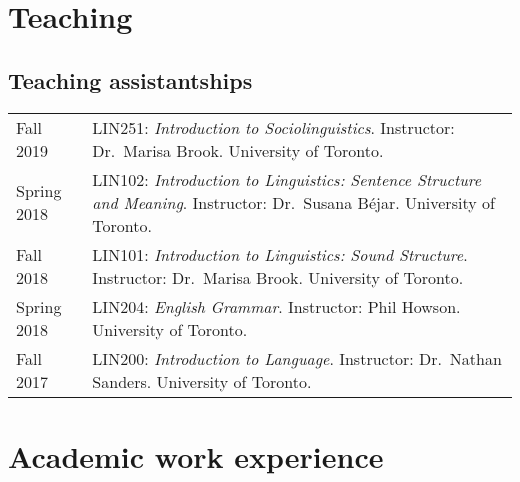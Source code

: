 \documentclass[letterpaper]{article}
\begin{document}
\section*{Teaching}

\subsection*{Teaching assistantships}

\begin{longtable}{p{}p{}}
    Fall 2019 & LIN251: \emph{Introduction to Sociolinguistics}. Instructor:
    Dr.~Marisa Brook. University of Toronto. \\
    Spring 2018 & LIN102: \emph{Introduction to Linguistics: Sentence Structure
    and Meaning}. Instructor: Dr.~Susana B\'ejar. University of Toronto. \\
    Fall 2018 & LIN101: \emph{Introduction to Linguistics: Sound Structure}.
    Instructor: Dr.~Marisa Brook. University of Toronto. \\
    Spring 2018 & LIN204: \emph{English Grammar}. Instructor: Phil Howson.
    University of Toronto. \\
    Fall 2017 & LIN200: \emph{Introduction to Language}. Instructor: Dr.~Nathan
    Sanders. University of Toronto. \\
\end{longtable}


\section*{Academic work experience}
\end{document}
